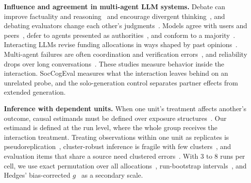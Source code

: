 \textbf{Influence and agreement in multi-agent LLM systems.} Debate can improve factuality and reasoning~\citep{Du2024_MultiagentDebate} and encourage divergent thinking~\citep{Liang2024_DivergentDebate}, and debating evaluators change each other's judgments~\citep{Chan2024_ChatEval}. Models agree with users and peers~\citep{Sharma2024_Sycophancy,Cheng2025_ELEPHANT}, defer to agents presented as authorities~\citep{Choi2026_Authority}, and conform to a majority~\citep{Weng2025_Conformity}. Interacting LLMs revise funding allocations in ways shaped by past opinions~\citep{CisnerosVelarde2025_Funding}. Multi-agent failures are often coordination and verification errors~\citep{Cemri2025_MASFailures}, and reliability drops over long conversations~\citep{Laban2025_LostMultiTurn}. These studies measure behavior inside the interaction. SocCogEval measures what the interaction leaves behind on an unrelated probe, and the solo-generation control separates partner effects from extended generation.

\textbf{Inference with dependent units.} When one unit's treatment affects another's outcome, causal estimands must be defined over exposure structures~\citep{Hudgens2008,Aronow2017}. Our estimand is defined at the run level, where the whole group receives the interaction treatment. Treating observations within one unit as replicates is pseudoreplication~\citep{Hurlbert1984}, cluster-robust inference is fragile with few clusters~\citep{Cameron2015}, and evaluation items that share a source need clustered errors~\citep{Miller2024_ErrorBars}. With 3 to 8 runs per cell, we use exact permutation over all allocations~\citep{Phipson2010}, run-bootstrap intervals~\citep{Efron1979}, and Hedges' bias-corrected $g$~\citep{Hedges1981} as a secondary scale.

